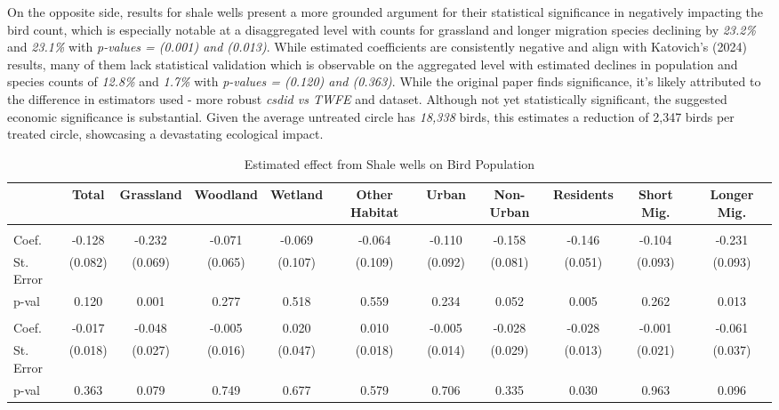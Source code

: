 \documentclass{article}
\begin{document}
\addlinespace

On the opposite side, results for shale wells present a more grounded argument for their statistical significance in negatively impacting the bird count, which is especially notable at a disaggregated level with counts for grassland and longer migration species declining by \textit{23.2\%} and \textit{23.1\%} with \textit{p-values = (0.001) and (0.013)}. While estimated coefficients are consistently negative and align with Katovich's (2024) results, many of them lack statistical validation which is observable on the aggregated level with estimated declines in population and species counts of \textit{12.8\%} and \textit{1.7\%} with \textit{p-values = (0.120) and (0.363)}. While the original paper finds significance, it's likely attributed to the difference in estimators used - more robust \textit{csdid vs TWFE} and dataset. Although not yet statistically significant, the suggested economic significance is substantial. Given the average untreated circle has \textit{18,338} birds, this estimates a reduction of 2,347 birds per treated circle, showcasing a devastating ecological impact.

\begin{table}[!ht]
\centering
\caption{Estimated effect from Shale wells on Bird Population}
\begin{adjustbox}{width=\textwidth}
\begin{tabular}{@{}lcccccccccc@{}}
\toprule
 & Total & Grassland & Woodland & Wetland & Other Habitat & Urban & Non-Urban & Residents & Short Mig. & Longer Mig. \\
\midrule
\addlinespace
\multicolumn{11}{l}{\hspace{-0.5em}\textbf{Total count}} \\
Coef. & -0.128 & -0.232 & -0.071 & -0.069 & -0.064 & -0.110 & -0.158 & -0.146 & -0.104 & -0.231 \\
St. Error & (0.082) & (0.069) & (0.065) & (0.107) & (0.109) & (0.092) & (0.081) & (0.051) & (0.093) & (0.093) \\
p-val & 0.120 & 0.001 & 0.277 & 0.518 & 0.559 & 0.234 & 0.052 & 0.005 & 0.262 & 0.013 \\
\addlinespace
\multicolumn{11}{l}{\hspace{-0.5em}\textbf{Total species}} \\
Coef. & -0.017 & -0.048 & -0.005 & 0.020 & 0.010 & -0.005 & -0.028 & -0.028 & -0.001 & -0.061 \\
St. Error & (0.018) & (0.027) & (0.016) & (0.047) & (0.018) & (0.014) & (0.029) & (0.013) & (0.021) & (0.037) \\
p-val & 0.363 & 0.079 & 0.749 & 0.677 & 0.579 & 0.706 & 0.335 & 0.030 & 0.963 & 0.096 \\
\bottomrule
\end{tabular}
\end{adjustbox}
\end{table}
\end{document}

